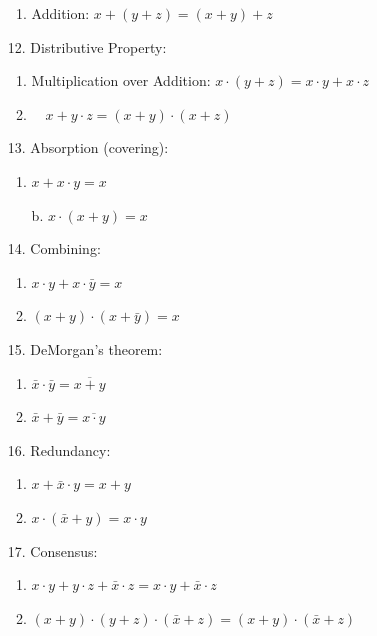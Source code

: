 \documentclass[12pt,openany, tikz,border=10pt]{book}
\begin{document}
\begin{multicols}{3}
\begin{enumerate}
\begin{enumerate}
                  \item Addition: \( x + (y + z) = (x + y) + z \)
                \end{enumerate}
                \vspace*{60px}
                \item[12.] Distributive Property:
                \begin{enumerate}
                  \item Multiplication over Addition: \( x \cdot (y + z) = x \cdot y + x \cdot z \)
                  \item $\quad x + y \cdot z = (x + y) \cdot (x + z)$
                \end{enumerate}
              
                    \item[13.] Absorption (covering):
                    \begin{enumerate}
                        \item $x + x \cdot y = x$
                        \item[b.] $x \cdot (x + y) = x$
                    \end{enumerate}
                    \item[14.] Combining:
                    \begin{enumerate}
                        \item $x \cdot y + x \cdot \bar{y} = x$
                        \item $(x + y) \cdot (x + \bar{y}) = x$ 
                    \end{enumerate}
                    \vspace*{20px}
                    \item[15.] DeMorgan's theorem:
                    \begin{enumerate}
                        \item $\bar{x} \cdot \bar{y} = \overline{x + y}$
                        \item $\bar{x} + \bar{y} = \overline{x \cdot y}$
                    \end{enumerate}
                    \item[16.] Redundancy:
                    \begin{enumerate}
                        \item $x + \bar{x} \cdot y = x + y$
                        \item $x \cdot (\bar{x} + y) = x \cdot y$
                    \end{enumerate}
                    \item[17.] Consensus:
                    \begin{enumerate}
                        \item $x \cdot y + y \cdot z + \bar{x} \cdot z = x \cdot y + \bar{x} \cdot z$
                        \item $(x + y) \cdot (y + z) \cdot (\bar{x} + z) = (x + y) \cdot (\bar{x} + z)$
                    \end{enumerate}
                \end{enumerate}
           

\end{multicols}
\end{document}
